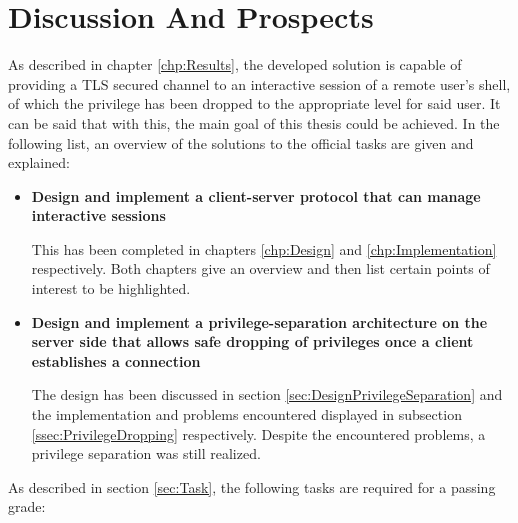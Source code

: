 \documentclass[10pt,a4paper,titlepage,twoside,english,final]{zhawreprt}
\begin{document}
\chapter{Discussion And Prospects}\label{chp:DiscussionAndProspects}
As described in chapter \ref{chp:Results}, the developed solution is capable of providing a \gls{TLS} secured channel to an interactive session of a remote user's \gls{shell}, of which the privilege has been dropped to the appropriate level for said user.
It can be said that with this, the main goal of this thesis could be achieved.
In the following list, an overview of the solutions to the official tasks are given and explained:
\begin{itemize}
\item \textbf{Design and implement a client-server protocol that can manage interactive sessions}

This has been completed in chapters \ref{chp:Design} and \ref{chp:Implementation} respectively.
Both chapters give an overview and then list certain points of interest to be highlighted.

\item \textbf{Design and implement a privilege-separation architecture on the server side that allows safe dropping of privileges once a client establishes a connection}

The design has been discussed in section \ref{sec:DesignPrivilegeSeparation} and the implementation and problems encountered displayed in subsection \ref{ssec:PrivilegeDropping} respectively.
Despite the encountered problems, a privilege separation was still realized.
\end{itemize}

As described in section \ref{sec:Task}, the following tasks are required for a passing grade:
\end{document}
